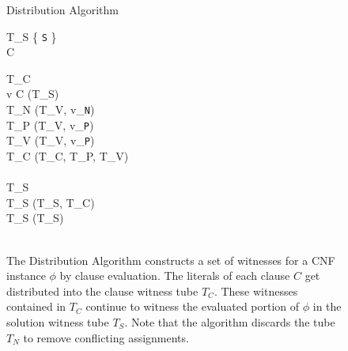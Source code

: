 
\begin{figure}[htbp]
	\renewcommand{\figurename}{Algorithm}
	\renewcommand{\thepseudocode}{\ref{distributionAlgorithm}}
	
	\begin{center}

	\begin{pseudocode}[shadowbox]{Distribution Algorithm}{\phi}
	
	T_S \GETS \{ \texttt{S} \} \\
	
	\FOREACH {} C  \phi \DO
		\BEGIN 
		
			T_C \GETS \emptyset \\
			\FOREACH {} v  C \DO
				\BEGIN
					[T_V, T_S] \GETS {}(T_S) \\
					T_N \GETS {}(T_V, v_{\texttt{N}})\\
					T_P \GETS {}(T_V, v_{\texttt{P}})\\
					T_V \GETS {}(T_V, v_{\texttt{P}})\\
					T_C \GETS {}(T_C, T_P, T_V)\\
				\END\\
				T_S \GETS \emptyset\\
				T_S \GETS {}(T_S, T_C)\\
				T_S \GETS {}(T_S)\\
		\END\\
	\end{pseudocode}

\caption{The {\sc Distribution Algorithm} constructs a set of witnesses for a CNF instance $\phi$ by clause evaluation.  The literals of each clause $C$ get distributed into the clause witness tube $T_C$.  These witnesses contained in $T_C$ continue to witness the evaluated portion of $\phi$ in the solution witness tube $T_S$.  Note that the algorithm discards the tube $T_N$ to remove conflicting assignments. }
\label{distributionAlgorithm}
\end{center}
\end{figure}

